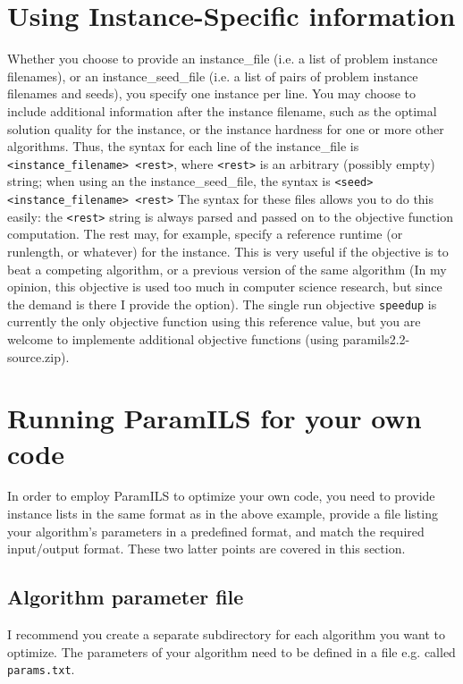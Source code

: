 \documentclass[10pt,letterpaper,twoside]{article}
\begin{document}
\section{Using Instance-Specific information}\label{sec:rest}
Whether you choose to provide an instance\_file (i.e. a list of problem instance filenames),
or an instance\_seed\_file (i.e. a list of pairs of problem instance filenames and seeds),
you specify one instance per line. 
You may choose to include additional information
after the instance filename, such as the optimal solution quality for the instance,
or the instance hardness for one or more other algorithms.
Thus, the syntax for each line of the instance\_file is 
\texttt{<instance\_filename> <rest>}, where \texttt{<rest>} is an arbitrary (possibly empty) string;
when using an the instance\_seed\_file, the syntax is 
\texttt{<seed> <instance\_filename> <rest>}
The syntax for these files allows you to do this easily: the \texttt{<rest>} string is always parsed and passed on to the objective function computation. 
The rest may, for example, specify a reference runtime (or runlength, or whatever) for the instance. This is very useful
if the objective is to beat a competing algorithm, or a previous version of the same algorithm (In my opinion, this objective is used 
too much in computer science research, but since the demand is there I provide the option). The single run objective \texttt{speedup}
is currently the only objective function using this reference value, but you are welcome to implemente additional 
objective functions (using paramils2.2-source.zip).

\section{Running ParamILS for your own code}
In order to employ ParamILS to optimize your own code, you need to provide instance lists in the same format as in the above example, 
provide a file listing your algorithm's parameters in a predefined format, and match the required input/output format. 
These two latter points are covered in this section.

\subsection{Algorithm parameter file}\label{sec:paramsfile}
I recommend you create a separate subdirectory for each algorithm you want to optimize.
The parameters of your algorithm need to be defined in a file e.g. called \texttt{params.txt}.
\end{document}
